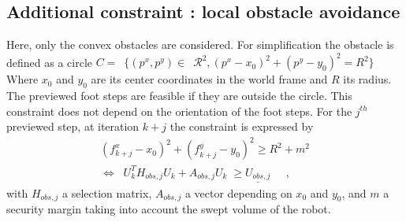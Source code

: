 \subsection{Additional constraint : local obstacle avoidance}
\label{Sec:avoidAnObstacle}

Here, only the convex obstacles are considered. For simplification the obstacle is defined as a circle $ C = $~$\{ (p^x,p^y) \in $~$\mathcal{R}^2, (p^x-x_0)^2+(p^y-y_0)^2 = R^2\}$
Where $x_0$ and $y_0$ are its center coordinates in the world frame and $R$ its radius.
The previewed foot steps are feasible if they are outside the circle.
This constraint does not depend on the orientation of the foot steps.
For the $j^{th}$ previewed step, at iteration $k+j$ the constraint is expressed by
\begin{align}
\left(f_{k+j}^x - x_0 \right)^2 + \left(f_{k+j}^y - y_0 \right)^2 \geq R^2 + m^2 \\
\iff \;\; U_k^T H_{obs,j} U_k + A_{obs,j} U_k \;\geq \underline{U_{obs,j}} \;\;\;\;\;
,
\end{align}
with $H_{obs,j}$ a selection matrix, $A_{obs,j}$ a vector depending on $x_0$ and $y_0$, and $m$ a security margin taking into account the swept volume of the robot.

